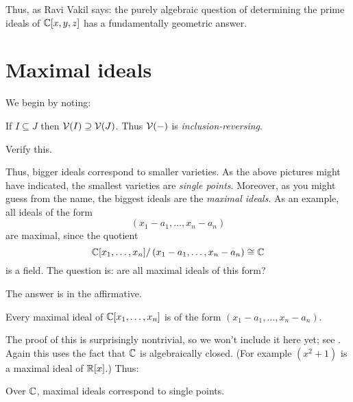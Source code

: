 Thus, as Ravi Vakil \cite{ref:vakil} says:
the purely algebraic question
of determining the prime ideals of $\mathbb C[x,y,z]$
has a fundamentally geometric answer.

\section{Maximal ideals}
We begin by noting:
\begin{proposition}
	If $I \subseteq J$ then $\mathcal V(I) \supseteq \mathcal V(J)$.
	Thus $\mathcal V(-)$ is \emph{inclusion-reversing}.
\end{proposition}
\begin{ques}
	Verify this.
\end{ques}
Thus, bigger ideals correspond to smaller varieties.
As the above pictures might have indicated,
the smallest varieties are \emph{single points}.
Moreover, as you might guess from the name,
the biggest ideals are the \emph{maximal ideals}.
As an example, all ideals of the form
\[ \left( x_1-a_1, \dots, x_n-a_n \right) \]
are maximal, since the quotient
\[ \mathbb C[x_1, \dots, x_n] / \left( x_1-a_1, \dots, x_n-a_n \right) \cong \mathbb C \]
is a field.
The question is: are all maximal ideals of this form?

The answer is in the affirmative.
\begin{theorem}
	Every maximal ideal of $\mathbb C[x_1, \dots, x_n]$
	is of the form $(x_1-a_1, \dots, x_n-a_n)$.
\end{theorem}
The proof of this is surprisingly nontrivial,
so we won't include it here yet; see \cite[\S7.4.3]{ref:vakil}.
Again this uses the fact that $\mathbb C$ is algebraically closed.
(For example $(x^2+1)$ is a maximal ideal of $\mathbb R[x]$.)
Thus:
\begin{moral}
	Over $\mathbb C$, maximal ideals correspond to single points.
\end{moral}

